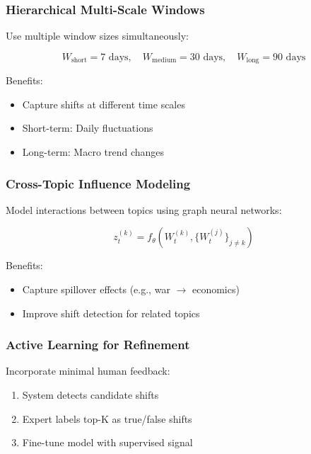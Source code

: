 \documentclass[12pt]{article}
\begin{document}
\subsubsection{Hierarchical Multi-Scale Windows}

Use multiple window sizes simultaneously:

\begin{equation}
W_{\text{short}} = 7 \text{ days}, \quad W_{\text{medium}} = 30 \text{ days}, \quad W_{\text{long}} = 90 \text{ days}
\end{equation}

Benefits:
\begin{itemize}
    \item Capture shifts at different time scales
    \item Short-term: Daily fluctuations
    \item Long-term: Macro trend changes
\end{itemize}

\subsubsection{Cross-Topic Influence Modeling}

Model interactions between topics using graph neural networks:

\begin{equation}
z_t^{(k)} = f_\theta\left(W_t^{(k)}, \{W_t^{(j)}\}_{j \neq k}\right)
\end{equation}

Benefits:
\begin{itemize}
    \item Capture spillover effects (e.g., war $\rightarrow$ economics)
    \item Improve shift detection for related topics
\end{itemize}

\subsubsection{Active Learning for Refinement}

Incorporate minimal human feedback:

\begin{enumerate}
    \item System detects candidate shifts
    \item Expert labels top-K as true/false shifts
    \item Fine-tune model with supervised signal
\end{enumerate}
\end{document}
